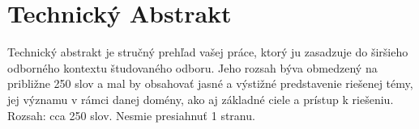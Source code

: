 \section{Technický Abstrakt}

Technický abstrakt je stručný prehľad vašej práce, ktorý ju zasadzuje do širšieho odborného kontextu študovaného odboru. Jeho rozsah býva obmedzený na približne 250 slov a mal by obsahovať jasné a výstižné predstavenie riešenej témy, jej významu v rámci danej domény, ako aj základné ciele a prístup k riešeniu. Rozsah: cca 250 slov. Nesmie presiahnuť 1 stranu.
